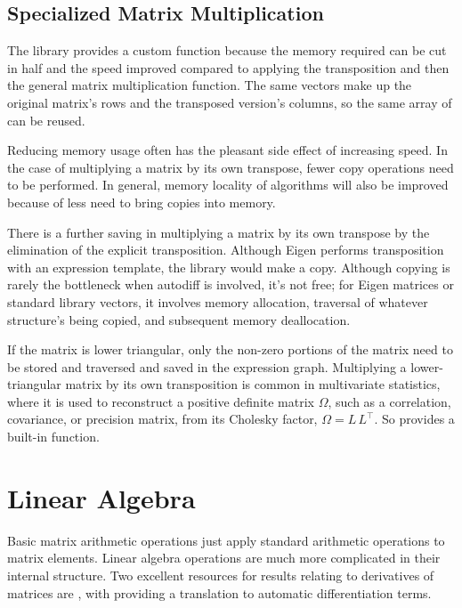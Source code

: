 \documentclass[10pt]{article}
\begin{document}
\subsection{Specialized Matrix Multiplication}

The  library provides a custom
 function because the memory required
can be cut in half and the speed improved compared to applying the
transposition and then the general matrix multiplication function. The
same vectors make up the original matrix's rows and the transposed
version's columns, so the same array of  can be reused.

Reducing memory usage often has the pleasant side effect of increasing
speed.  In the case of multiplying a matrix by its own transpose,
fewer copy operations need to be performed.  In general, memory
locality of algorithms will also be improved because of less need to
bring copies into memory.  

There is a further saving in multiplying a matrix by its own transpose
by the elimination of the explicit transposition.  Although Eigen
performs transposition with an expression template, the
 library would make a copy.  Although copying is
rarely the bottleneck when autodiff is involved, it's not free; for
Eigen matrices or standard library vectors, it involves memory
allocation, traversal of whatever structure's being copied, and
subsequent memory deallocation.

If the matrix is lower triangular, only the non-zero portions of the
matrix need to be stored and traversed and saved in the expression
graph.  Multiplying a lower-triangular matrix by its own transposition
is common in multivariate statistics, where it is used to reconstruct
a positive definite matrix $\Omega$, such as a correlation,
covariance, or precision matrix, from its Cholesky factor, $\Omega =
L\,L^{\top}$.  So  provides a built-in
 function.




\section{Linear Algebra}

Basic matrix arithmetic operations just apply standard arithmetic
operations to matrix elements.  Linear algebra operations are much
more complicated in their internal structure.  Two excellent resources
for results relating to derivatives of matrices are
\cite{PetersenPedersen:2008,MagnusNeudecker:2007}, with
\cite{Giles:2008} providing a translation to automatic differentiation
terms.
\end{document}
